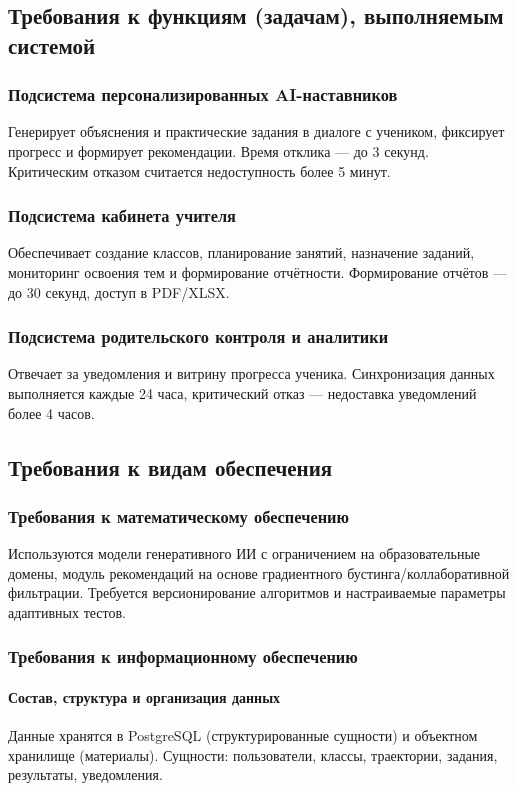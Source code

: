 \documentclass[14pt,a4paper]{extarticle}
\begin{document}
\subsection{Требования к функциям (задачам), выполняемым системой}
\subsubsection{Подсистема персонализированных AI-наставников}
Генерирует объяснения и практические задания в диалоге с учеником, фиксирует прогресс и формирует рекомендации. Время отклика — до 3 секунд. Критическим отказом считается недоступность более 5 минут.

\subsubsection{Подсистема кабинета учителя}
Обеспечивает создание классов, планирование занятий, назначение заданий, мониторинг освоения тем и формирование отчётности. Формирование отчётов — до 30 секунд, доступ в PDF/XLSX.

\subsubsection{Подсистема родительского контроля и аналитики}
Отвечает за уведомления и витрину прогресса ученика. Синхронизация данных выполняется каждые 24 часа, критический отказ — недоставка уведомлений более 4 часов.

\subsection{Требования к видам обеспечения}
\subsubsection{Требования к математическому обеспечению}
Используются модели генеративного ИИ с ограничением на образовательные домены, модуль рекомендаций на основе градиентного бустинга/коллаборативной фильтрации. Требуется версионирование алгоритмов и настраиваемые параметры адаптивных тестов.

\subsubsection{Требования к информационному обеспечению}
\paragraph{Состав, структура и организация данных} Данные хранятся в PostgreSQL (структурированные сущности) и объектном хранилище (материалы). Сущности: пользователи, классы, траектории, задания, результаты, уведомления.
\end{document}
